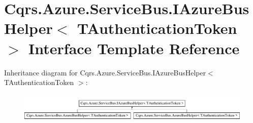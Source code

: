 \hypertarget{interfaceCqrs_1_1Azure_1_1ServiceBus_1_1IAzureBusHelper}{}\section{Cqrs.\+Azure.\+Service\+Bus.\+I\+Azure\+Bus\+Helper$<$ T\+Authentication\+Token $>$ Interface Template Reference}
\label{interfaceCqrs_1_1Azure_1_1ServiceBus_1_1IAzureBusHelper}
Inheritance diagram for Cqrs.\+Azure.\+Service\+Bus.\+I\+Azure\+Bus\+Helper$<$ T\+Authentication\+Token $>$\+:\begin{figure}[H]
\begin{center}
\leavevmode
\includegraphics[height=1.407035cm]{interfaceCqrs_1_1Azure_1_1ServiceBus_1_1IAzureBusHelper}
\end{center}
\end{figure}
